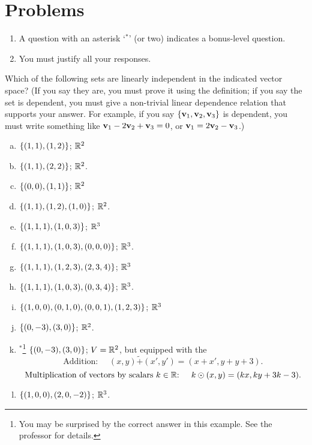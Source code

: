 \section*{Problems}

\begin{enumerate}
\item A question with an asterisk `$ ^\ast$' (or two) indicates a bonus-level question.
 \item You must justify all your responses.
\end{enumerate}
\bigskip

\begin{prob} \label{prob07.1} Which of the following sets are linearly independent in the indicated vector space? (If you say they are, you must prove it using the definition; if you say  the set is dependent, you must give a non-trivial linear dependence relation that supports your answer. For example, if you say $\{\mathbf{v}_1, \mathbf{v}_2, \mathbf{v}_3 \}$ is dependent, you must write something like  $\mathbf{v}_1-2 \mathbf{v}_2 +\mathbf{v}_3=0$, or $\mathbf{v}_1=2 \mathbf{v}_2 -\mathbf{v}_3$.)
\medskip
\begin{enumerate}[a)]
\item $\{(1,1), (1, 2) \}$; $\mathbb{R}^2$
\medskip
%
\item\sov $\{(1,1), (2, 2) \}$; $\mathbb{R}^2$.
\medskip
%


\item $\{(0,0), (1, 1) \}$; $\mathbb{R}^2$
\medskip
%
\item\sov $\{(1,1), (1, 2), (1,0) \}$; $\mathbb{R}^2$.

\medskip
%
\item $\{(1,1,1), (1,0,3) \}$; $\mathbb{R}^3$
\medskip
%
\item\sov $\{(1,1,1), (1,0,3), (0,0,0) \}$; $\mathbb{R}^3$.

\medskip
%
\item $\{(1,1,1), (1,2,3), (2,3,4) \}$; $\mathbb{R}^3$
\medskip
%
 
\item\sov $\{(1,1,1), (1,0,3), (0,3,4) \}$; $\mathbb{R}^3$.


\medskip 
%
\item $\{(1,0,0), (0,1,0), (0,0,1), (1,2,3) \}$; $\mathbb{R}^3$
\medskip
%
\item\sov $\{(0,-3), (3, 0) \}$; $\mathbb{R}^2$.


\medskip
%

\item$^\ast$\footnote{You may be surprised by the correct answer in this example. See the professor for details.}  $\{(0,-3), (3, 0) \}$; $V=\mathbb{R}^2$, but equipped with the   $$\text{Addition: }\quad(x,y) \tilde+ (x',y')=(x+x', y+y +3).$$ 
$$\text{Multiplication of vectors  by  scalars $k\in \mathbb{R}$: }\quad k \odot (x,y)=(kx, ky+3k-3).$$    
%
\item\sov $\{(1,0,0), (2,0,-2) \}$; $\mathbb{R}^3$. 


\end{enumerate}
\end{prob}
